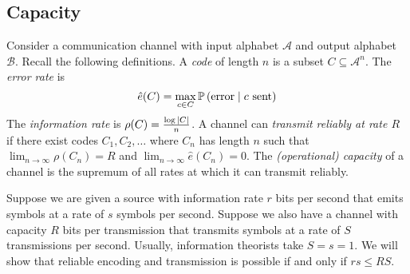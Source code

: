 \subsection{Capacity}
Consider a communication channel with input alphabet \( \mathcal A \) and output alphabet \( \mathcal B \).
Recall the following definitions.
A \emph{code} of length \( n \) is a subset \( C \subseteq \mathcal A^n \).
The \emph{error rate} is
\[ \hat e(C) = \max_{c \in C} \mathbb{P}\left({\text{error} \mid c \text{ sent}}\right) \]
The \emph{information rate} is \( \rho(C) = \frac{\log \abs{C}}{n} \).
A channel can \emph{transmit reliably at rate \( R \)} if there exist codes \( C_1, C_2, \dots \) where \( C_n \) has length \( n \) such that \( \lim_{n \to \infty} \rho(C_n) = R \) and \( \lim_{n \to \infty} \hat e(C_n) = 0 \).
The \emph{(operational) capacity} of a channel is the supremum of all rates at which it can transmit reliably.

Suppose we are given a source with information rate \( r \) bits per second that emits symbols at a rate of \( s \) symbols per second.
Suppose we also have a channel with capacity \( R \) bits per transmission that transmits symbols at a rate of \( S \) transmissions per second.
Usually, information theorists take \( S = s = 1 \).
We will show that reliable encoding and transmission is possible if and only if \( rs \leq RS \).

